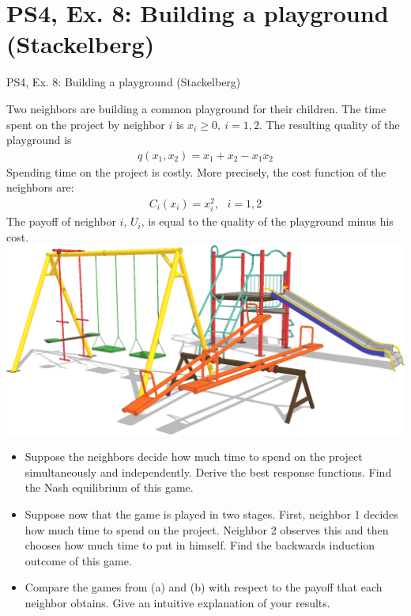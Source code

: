 \section{PS4, Ex. 8: Building a playground (Stackelberg)}

\begin{frame}{PS4, Ex. 8: Building a playground (Stackelberg)}
  \begin{multicols}{2}
    Two neighbors are building a common playground for their children. The time spent on the project by neighbor $i$ is $x_i \geq 0,\ i = 1, 2$. The resulting quality of the playground is
    \begin{align*}
      q(x_1,x_2)=x_1+x_2-x_1x_2
    \end{align*}
    Spending time on the project is costly. More precisely, the cost function of the neighbors are:
    \begin{align*}
      C_i(x_i)=x_i^2,\ \ \ i=1,2
    \end{align*}
    The payoff of neighbor $i$, $U_i$, is equal to the quality of the playground minus his cost.
    \includegraphics[width=\columnwidth]{figures/playground}
  \vfill\null \columnbreak
    \begin{itemize}
      \item[(a)] Suppose the neighbors decide how much time to spend on the project simultaneously and independently. Derive the best response functions. Find the Nash equilibrium of this game.
      \item[(b)] Suppose now that the game is played in two stages. First, neighbor 1 decides how much time to spend on the project. Neighbor 2 observes this and then chooses how much time to put in himself. Find the backwards induction outcome of this game.
      \item[(c)] Compare the games from (a) and (b) with respect to the payoff that each neighbor obtains. Give an intuitive explanation of your results.
    \end{itemize}
  \vfill\null
  \end{multicols}
\end{frame}

